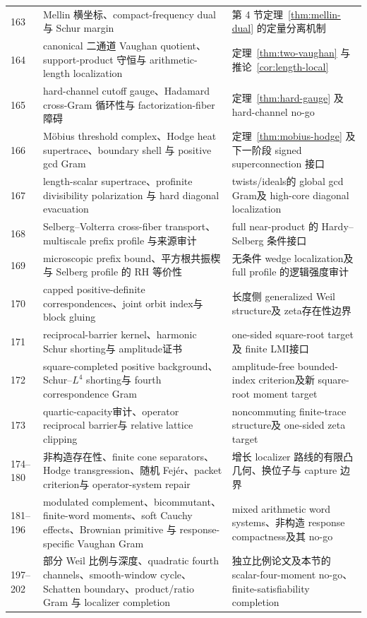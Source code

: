 \documentclass[UTF8,11pt,a4paper]{ctexart}
\theoremstyle{definition}
\theoremstyle{remark}
\newcommand{\1}{\mathbf 1}
\begin{document}
\begin{longtable}{@{}p{}p{}p{}@{}}
163 & Mellin 横坐标、compact-frequency dual 与 Schur margin & 第 4 节定理~\ref{thm:mellin-dual} 的定量分离机制\\
164 & canonical 二通道 Vaughan quotient、support-product 守恒与 arithmetic-length localization & 定理~\ref{thm:two-vaughan} 与推论~\ref{cor:length-local}\\
165 & hard-channel cutoff gauge、Hadamard cross-Gram 循环性与 factorization-fiber 障碍 & 定理~\ref{thm:hard-gauge} 及 hard-channel no-go\\
166 & M\"obius threshold complex、Hodge heat supertrace、boundary shell 与 positive gcd Gram & 定理~\ref{thm:mobius-hodge} 及下一阶段 signed superconnection 接口\\
167 & length-scalar supertrace、profinite divisibility polarization 与 hard diagonal evacuation & twists/ideals的 global gcd Gram及 high-core diagonal localization\\
168 & Selberg--Volterra cross-fiber transport、multiscale prefix profile 与来源审计 & full near-product 的 Hardy--Selberg 条件接口\\
169 & microscopic prefix bound、平方根共振楔与 Selberg profile 的 RH 等价性 & 无条件 wedge localization及 full profile 的逻辑强度审计\\
170 & capped positive-definite correspondences、joint orbit index与 block gluing & 长度侧 generalized Weil structure及 zeta存在性边界\\
171 & reciprocal-barrier kernel、harmonic Schur shorting与 amplitude证书 & one-sided square-root target及 finite LMI接口\\
172 & square-completed positive background、Schur--$L^4$ shorting与 fourth correspondence Gram & amplitude-free bounded-index criterion及新 square-root moment target\\
173 & quartic-capacity审计、operator reciprocal barrier与 relative lattice clipping & noncommuting finite-trace structure及 one-sided zeta target\\
174--180 & 非构造存在性、finite cone separators、Hodge transgression、随机 Fej\'er、packet criterion与 operator-system repair & 增长 localizer 路线的有限凸几何、换位子与 capture 边界\\
181--196 & modulated complement、bicommutant、finite-word moments、soft Cauchy effects、Brownian primitive 与 response-specific Vaughan Gram & mixed arithmetic word systems、非构造 response compactness及其 no-go\\
197--202 & 部分 Weil 比例与深度、quadratic fourth channels、smooth-window cycle、Schatten boundary、product/ratio Gram 与 localizer completion & 独立比例论文及本节的 scalar-four-moment no-go、finite-satisfiability completion\\
\bottomrule
\end{longtable}
\endgroup
\end{document}
